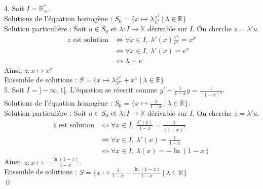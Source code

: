 \documentclass[10pt]{article}
\begin{document}
\begin{tcolorbox}[enhanced, width=7in, center, size=fbox, fontupper=\large, drop shadow southwest]
    4. Soit $I=\mathbb{R}^*_+$.\\
    Solutions de l'équation homogène : $S_0=\{x\mapsto\lambda \frac{x^x}{e^x} ~ | ~ \lambda \in\mathbb{R}\}$\\
    Solution particulière : Soit $u\in S_0$ et $\lambda : I \rightarrow \mathbb{K}$ dérivable sur $I$. On cherche $z=\lambda'u$.
    \begin{align*}
        z \text{ est solution} &\iff \forall{x\in I}, ~ \lambda'(x)\frac{x^x}{e^x} = x^x\\
        &\iff \forall{x \in I}, ~ \lambda'(x) = e^x\\
        &\iff \lambda = e^\cdot
    \end{align*}
    Ainsi, $z:x \mapsto x^x$\\
    Ensemble de solutions : $S = \{x\mapsto \lambda\frac{x^x}{e^x} + x^x ~ | ~ \lambda \in \mathbb{R}\}$\\
    5. Soit $I=]-\infty,1[$. L'équation se réecrit comme $y' - \frac{1}{1-x}y = \frac{1}{(1-x)^2}$.\\
    Solutions de l'équation homogène : $S_0 = \{x\mapsto\frac{\lambda}{1-x} ~ | ~ \lambda\in\mathbb{R}\}$.\\
    Solution particulière : Soit $u\in S_0$ et $\lambda:I\rightarrow\mathbb{K}$ dérivable sur $I$. On cherche $z=\lambda'u$.
    \begin{align*}
        z \text{ est solution} &\iff \forall{x\in I}, ~ \frac{\lambda'(x)}{1-x} = \frac{1}{(1-x)^2}\\
        &\iff \forall{x\in I}, ~ \lambda'(x) = \frac{1}{1-x}\\
        &\iff \forall{x\in I}, ~ \lambda(x) = -\ln(1-x) 
    \end{align*} 
    Ainsi, $z:x\mapsto -\frac{\ln(1-x)}{1-x}$.\\
    Ensemble de solutions : $S = \{x \mapsto \frac{\lambda}{1-x} - \frac{\ln(1-x)}{1-x} ~ | ~ \lambda \in \mathbb{R}\}$\\
    \qed
\end{tcolorbox}

\end{document}
